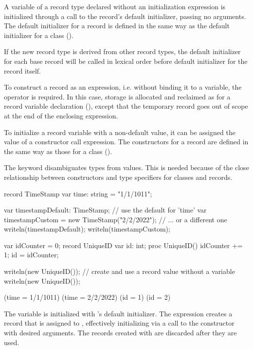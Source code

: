A variable of a record type declared without an initialization expression
is initialized through a call to the record's default initializer, passing no arguments.
The default initializer for a record is defined in the same way as the default
initializer for a class ().

If the new record type is derived from other record types, the
default initializer for each base record will be called in lexical order before default
initializer for the record itself.

To construct a record as an expression,
i.e. without binding it to a variable, the  operator is
required.  In this case, storage is allocated and reclaimed as for a record
variable declaration (), except that the temporary record
goes out of scope at the end of the enclosing expression.

To initialize a record variable with a non-default value, it can be assigned
the value of a constructor call expression.  The constructors for a record are
defined in the same way as those for a class ().

\begin{rationale}
The  keyword disambiguates types from values. This is needed because of the close
relationship between constructors and type specifiers for classes and
records.
\end{rationale}

\begin{example}
\begin{chapelpre}
\end{chapelpre}
\begin{chapel}
record TimeStamp {
  var time: string = "1/1/1011";
}

var timestampDefault: TimeStamp;                  // use the default for 'time'
var timestampCustom = new TimeStamp("2/2/2022");  // ... or a different one
writeln(timestampDefault);
writeln(timestampCustom);

var idCounter = 0;
record UniqueID {
  var id: int;
  proc UniqueID() { idCounter += 1; id = idCounter; }
}

writeln(new UniqueID());  // create and use a record value without a variable
writeln(new UniqueID());
\end{chapel}
\begin{chapeloutput}
(time = 1/1/1011)
(time = 2/2/2022)
(id = 1)
(id = 2)
\end{chapeloutput}
The variable  is initialized with 's
default initializer. The  expression creates a record that is assigned to , effectively initializing  via a call to the constructor with desired arguments. The records created with  are discarded after they are used.
\end{example}

